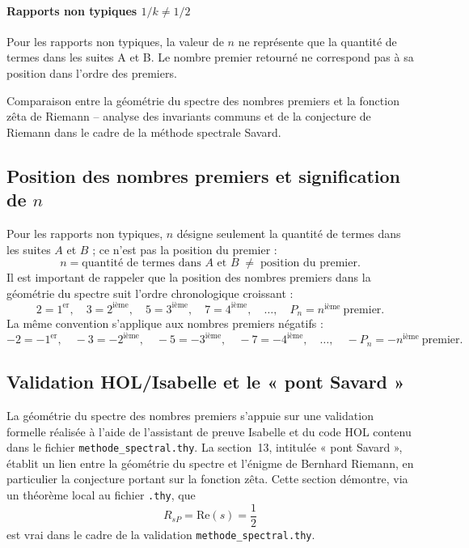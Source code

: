 \documentclass[11pt,a4paper]{article}
\begin{document}
\paragraph{Rapports non typiques $1/k \neq 1/2$}

Pour les rapports non typiques, la valeur de $n$ ne représente que la quantité de termes dans les suites A et B. Le nombre premier retourné ne correspond pas à sa position dans l'ordre des premiers.

\vspace{0.5cm}

Comparaison entre la géométrie du spectre des nombres premiers et la fonction zêta de Riemann -- analyse des invariants communs et de la conjecture de Riemann dans le cadre de la méthode spectrale Savard.
\medskip
\subsection*{Position des nombres premiers et signification de $n$}

Pour les rapports non typiques, $n$ désigne seulement la quantité de termes
dans les suites $A$ et $B$ ; ce n'est pas la position du premier :
\[
n=\text{quantité de termes dans }A\text{ et }B\;\neq\;\text{position du premier.}
\]
Il est important de rappeler que la position des nombres premiers dans la
géométrie du spectre suit l'ordre chronologique croissant :
\[
2=1^{\text{er}},\quad 3=2^{\text{ième}},\quad 5=3^{\text{ième}},\quad
7=4^{\text{ième}},\quad \dots,\quad P_n=n^{\text{ième}}\ \text{premier.}
\]
La même convention s'applique aux nombres premiers négatifs :
\[
-2=-1^{\text{er}},\quad -3=-2^{\text{ième}},\quad -5=-3^{\text{ième}},\quad
-7=-4^{\text{ième}},\quad \dots,\quad -P_n=-n^{\text{ième}}\ \text{premier.}
\]

\subsection*{Validation HOL/Isabelle et le « pont Savard »}

La géométrie du spectre des nombres premiers s'appuie sur une validation formelle
réalisée à l'aide de l'assistant de preuve Isabelle et du code HOL contenu dans le
fichier \texttt{methode\_spectral.thy}. La section~13, intitulée « pont Savard »,
établit un lien entre la géométrie du spectre et l'énigme de Bernhard Riemann, en
particulier la conjecture portant sur la fonction zêta. Cette section démontre, via
un théorème local au fichier \texttt{.thy}, que
\[
R_{sP}=\mathrm{Re}(s)=\frac{1}{2}
\]
est vrai dans le cadre de la validation \texttt{methode\_spectral.thy}.
\end{document}
